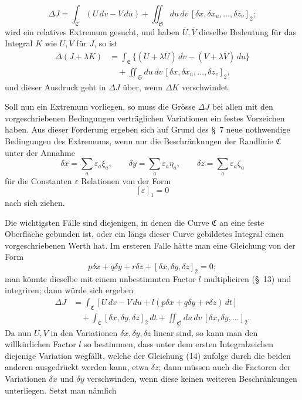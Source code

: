 \documentclass[11pt,a4paper,leqno]{article}
\begin{document}
\[
\Delta J=\int_{\mathfrak{C}}(U\,dv-V\,du)
+\iint_{\mathfrak{S}}du\,dv\,
[\delta x,\delta x_u,\ldots,\delta z_v]_2;
\]
wird ein relatives Extremum gesucht, und haben $\bar U,\bar V$ dieselbe
Bedeutung für das Integral $K$ wie $U,V$ für $J$, so ist
\begin{equation}\tag{13}
\begin{aligned}
\Delta(J+\lambda K)
&=\int_{\mathfrak{C}}
\{(U+\lambda\bar U)\,dv-(V+\lambda\bar V)\,du\}\\
&\quad+\iint_{\mathfrak{S}}du\,dv\,
[\delta x,\delta x_u,\ldots,\delta z_v]_2,
\end{aligned}
\end{equation}
und dieser Ausdruck geht in $\Delta J$ über, wenn $\Delta K$ verschwindet.

Soll nun ein Extremum vorliegen, so muss die Grösse $\Delta J$ bei allen mit
den vorgeschriebenen Bedingungen verträglichen Variationen ein festes
Vorzeichen haben. Aus dieser Forderung ergeben sich auf Grund des \S~7 neue
nothwendige Bedingungen des Extremums, wenn nur die Beschränkungen der
Randlinie $\mathfrak{C}$ unter der Annahme
\[
\delta x=\sum_a\varepsilon_a\xi_a,\qquad
\delta y=\sum_a\varepsilon_a\eta_a,\qquad
\delta z=\sum_a\varepsilon_a\zeta_a
\]
für die Constanten $\varepsilon$ Relationen von der Form
\[
[\varepsilon]_1=0
\]
nach sich ziehen.

Die wichtigsten Fälle sind diejenigen, in denen die Curve $\mathfrak{C}$ an
eine feste Oberfläche gebunden ist, oder ein längs dieser Curve gebildetes
Integral einen vorgeschriebenen Werth hat. Im ersteren Falle hätte man eine
Gleichung von der Form
\begin{equation}\tag{14}
p\delta x+q\delta y+r\delta z+[\delta x,\delta y,\delta z]_2=0;
\end{equation}
man könnte dieselbe mit einem unbestimmten Factor $l$ multipliciren (\S~13)
und integriren; dann würde sich ergeben
\[
\begin{aligned}
\Delta J
&=\int_{\mathfrak{C}}
[U\,dv-V\,du+l(p\delta x+q\delta y+r\delta z)\,dt]\\
&\quad+\int_{\mathfrak{C}}[\delta x,\delta y,\delta z]_2\,dt
+\iint_{\mathfrak{S}}du\,dv\,[\delta x,\delta y,\ldots]_2.
\end{aligned}
\]
Da nun $U,V$ in den Variationen $\delta x,\delta y,\delta z$ linear sind, so
kann man den willkürlichen Factor $l$ so bestimmen, dass unter dem ersten
Integralzeichen diejenige Variation wegfällt, welche der Gleichung (14)
zufolge durch die beiden anderen ausgedrückt werden kann, etwa $\delta z$;
dann müssen auch die Factoren der Variationen $\delta x$ und $\delta y$
verschwinden, wenn diese keinen weiteren Beschränkungen unterliegen. Setzt man
nämlich
\end{document}
